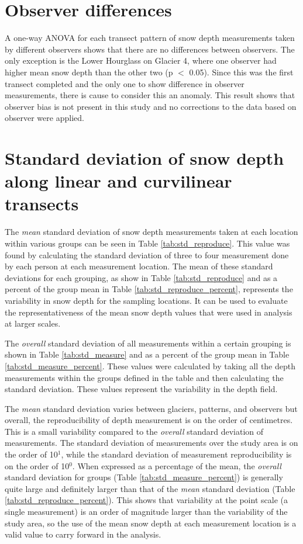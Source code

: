 \documentclass[12pt]{article}
\begin{document}
\section{Observer differences}

A one-way ANOVA for each transect pattern of snow depth measurements taken by different observers  shows that there are no differences between observers. The only exception is the Lower Hourglass on Glacier 4, where one observer had higher mean snow depth than the other two (p $<$ 0.05). Since this was the first transect completed and the only one to show difference in observer measurements, there is cause to consider this an anomaly. This result shows that observer bias is not present in this study and no corrections to the data based on observer were applied.

\section{Standard deviation of snow depth along linear and curvilinear transects}

The \textit{mean} standard deviation of snow depth measurements taken at each location within various groups can be seen in Table \ref{tab:std_reproduce}. This value was found by calculating the standard deviation of three to four measurement done by each person at each measurement location. The mean of these standard deviations for each grouping, as show in Table \ref{tab:std_reproduce} and as a percent of the group mean in Table \ref{tab:std_reproduce_percent}, represents the variability in snow depth for the sampling locations. It can be used to evaluate the representativeness of the mean snow depth values that were used in analysis at larger scales.

The \textit{overall} standard deviation of all measurements within a certain grouping is shown in Table \ref{tab:std_measure} and as a percent of the group mean in Table \ref{tab:std_measure_percent}. These values were calculated by taking all the depth measurements within the groups defined in the table and then calculating the standard deviation. These values represent the variability in the depth field. 

The \textit{mean} standard deviation varies between glaciers, patterns, and observers but overall, the reproducibility of depth measurement is on the order of centimetres. This is a small variability compared to the \textit{overall} standard deviation of measurements. The standard deviation of measurements over the study area is on the order of 10$^1$, while the standard deviation of measurement reproducibility is on the order of 10$^0$. When expressed as a percentage of the mean, the \textit{overall} standard deviation for groups (Table \ref{tab:std_measure_percent}) is generally quite large and definitely larger than that of the \textit{mean} standard deviation (Table \ref{tab:std_reproduce_percent}). This shows that variability at the point scale (a single measurement) is an order of magnitude larger than the variability of the study area, so the use of the mean snow depth at each measurement location is a valid value to carry forward in the analysis. 
\end{document}
